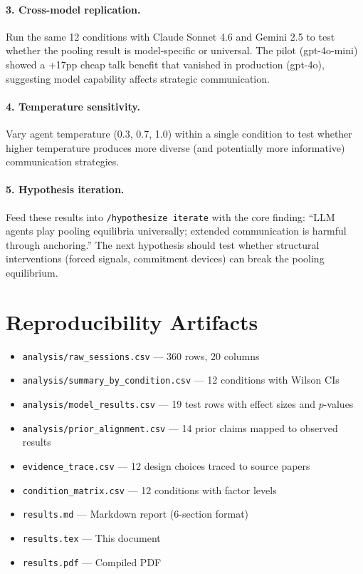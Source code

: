\documentclass[11pt]{article}
\begin{document}
\paragraph{3. Cross-model replication.} Run the same 12 conditions with Claude Sonnet 4.6 and Gemini 2.5 to test whether the pooling result is model-specific or universal. The pilot (gpt-4o-mini) showed a +17pp cheap talk benefit that vanished in production (gpt-4o), suggesting model capability affects strategic communication.

\paragraph{4. Temperature sensitivity.} Vary agent temperature (0.3, 0.7, 1.0) within a single condition to test whether higher temperature produces more diverse (and potentially more informative) communication strategies.

\paragraph{5. Hypothesis iteration.} Feed these results into \texttt{/hypothesize iterate} with the core finding: ``LLM agents play pooling equilibria universally; extended communication is harmful through anchoring.'' The next hypothesis should test whether structural interventions (forced signals, commitment devices) can break the pooling equilibrium.

\section*{Reproducibility Artifacts}
\begin{itemize}
\item \texttt{analysis/raw\_sessions.csv} --- 360 rows, 20 columns
\item \texttt{analysis/summary\_by\_condition.csv} --- 12 conditions with Wilson CIs
\item \texttt{analysis/model\_results.csv} --- 19 test rows with effect sizes and $p$-values
\item \texttt{analysis/prior\_alignment.csv} --- 14 prior claims mapped to observed results
\item \texttt{evidence\_trace.csv} --- 12 design choices traced to source papers
\item \texttt{condition\_matrix.csv} --- 12 conditions with factor levels
\item \texttt{results.md} --- Markdown report (6-section format)
\item \texttt{results.tex} --- This document
\item \texttt{results.pdf} --- Compiled PDF
\end{itemize}
\end{document}
